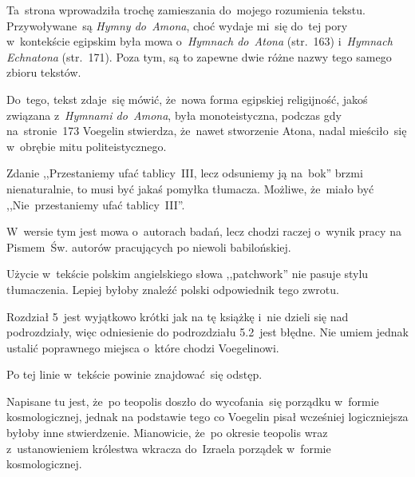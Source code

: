 \documentclass[a4paper,11pt]{article}
\begin{document}
\vspace{\spaceFour}


\start {} Ta~strona wprowadziła trochę zamieszania do~mojego
rozumienia tekstu. Przywoływane~są \emph{Hymny do~Amona}, choć wydaje
mi~się do~tej pory w~kontekście egipskim była mowa o~\emph{Hymnach
  do~Atona} (str.~163) i~\emph{Hymnach Echnatona} (str.~171). Poza
tym, są to zapewne dwie różne nazwy tego samego zbioru tekstów.

Do~tego, tekst zdaje~się mówić, że~nowa forma egipskiej religijność,
jakoś związana z~\emph{Hymnami do~Amona}, była monoteistyczna, podczas
gdy na~stronie~173 Voegelin stwierdza, że~nawet stworzenie Atona,
nadal mieściło~się w~obrębie mitu politeistycznego.

\vspace{\spaceFour}


\start {} Zdanie ,,Przestaniemy ufać tablicy~III, lecz
odsuniemy ją na~bok'' brzmi nienaturalnie, to musi być jakaś pomyłka
tłumacza. Możliwe, że~miało być ,,Nie~przestaniemy ufać tablicy~III''.

\vspace{\spaceFour}


\start {} W~wersie tym jest mowa o~autorach badań, lecz
chodzi raczej o~wynik pracy na Pismem~Św. autorów pracujących po
niewoli babilońskiej.

\vspace{\spaceFour}


\start {} Użycie w~tekście polskim angielskiego słowa
,,patchwork'' nie pasuje stylu tłumaczenia. Lepiej byłoby znaleźć
polski odpowiednik tego zwrotu.

\vspace{\spaceFour}


\start {} Rozdział 5~jest wyjątkowo krótki jak na tę
książkę i~nie dzieli się nad podrozdziały, więc odniesienie do
podrozdziału 5.2~jest błędne. Nie umiem jednak ustalić poprawnego
miejsca o~które chodzi Voegelinowi.

\vspace{\spaceFour}


\start {} Po tej linie w~tekście powinie znajdować~się
odstęp.

\vspace{\spaceFour}


\start {} Napisane tu jest, że~po teopolis doszło do
wycofania~się porządku w~formie kosmologicznej, jednak na podstawie
tego co Voegelin pisał wcześniej logiczniejsza byłoby inne
stwierdzenie. Mianowicie, że~po okresie teopolis wraz z~ustanowieniem
królestwa wkracza do~Izraela porządek w~formie kosmologicznej.
\end{document}
